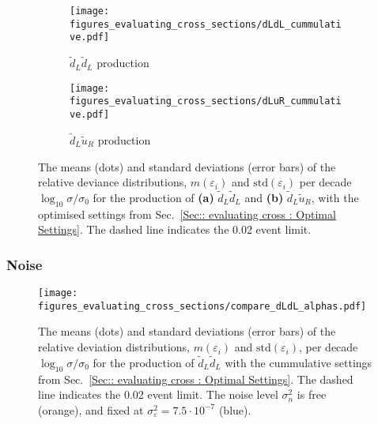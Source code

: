 \documentclass[twoside,english]{uiofysmaster}
\begin{document}
{{\begin{figure}
    \centering
    \begin{subfigure}[b]{0.8\textwidth}
        \texttt{[image: figures\_evaluating\_cross\_sections/dLdL\_cummulative.pdf]}
        \caption{$\widetilde{d}_L \widetilde{d}_L$ production}
        \label{Fig:: evaluating cross : RD cummulative dLdL}
    \end{subfigure}
    \begin{subfigure}[b]{0.8\textwidth}
        \texttt{[image: figures\_evaluating\_cross\_sections/dLuR\_cummulative.pdf]}
        \caption{$\widetilde{d}_L \widetilde{u}_R$ production}
        \label{Fig:: evaluating cross : RD cummulative dLuR}
    \end{subfigure}
    \caption{The means (dots) and standard deviations (error bars) of the relative deviance distributions, $m(\varepsilon_i)$ and $\mathrm{std}(\varepsilon_i)$ per decade $ \log_{10} \sigma/\sigma_0$ for the production of \textbf{(a)} $\widetilde{d}_L \widetilde{d}_L$ and \textbf{(b)} $\widetilde{d}_L \widetilde{u}_R$, with the optimised settings from Sec.~\ref{Sec:: evaluating cross : Optimal Settings}. The dashed line indicates the 0.02 event limit.}
\label{Fig:: evaluating cross : RD cummulative dLdL dLuR}
\end{figure}


\subsubsection{Noise}

\begin{figure}
\centering
\texttt{[image: figures\_evaluating\_cross\_sections/compare\_dLdL\_alphas.pdf]}
\caption{The means (dots) and standard deviations (error bars) of the relative deviation distributions, $m(\varepsilon_i)$ and $\mathrm{std}(\varepsilon_i)$, per decade $\log_{10} \sigma /\sigma_0$ for the production of $\widetilde{d}_L \widetilde{d}_L$ with the cummulative settings from Sec.~\ref{Sec:: evaluating cross : Optimal Settings}. The dashed line indicates the 0.02 event limit. The noise level $\sigma_n^2$ is free (orange), and fixed at $\sigma_{\varepsilon}^2=7.5 \cdot 10^{-7}$ (blue).}
\label{Fig:: evaluating cross : errors distribution alpha vs no alpha optimal}
\end{figure}


}}
\end{document}
